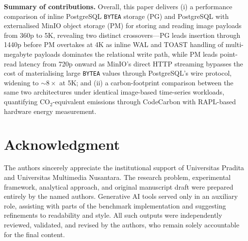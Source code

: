 \documentclass[conference]{IEEEtran}
\begin{document}
\textbf{Summary of contributions.} Overall, this paper delivers (i) a performance comparison of inline PostgreSQL \texttt{BYTEA} storage (PG) and PostgreSQL with externalised MinIO object storage (PM) for storing and reading image payloads from 360p to 5K, revealing two distinct crossovers---PG leads insertion through 1440p before PM overtakes at 4K as inline WAL and TOAST handling of multi-megabyte payloads dominates the relational write path, while PM leads point-read latency from 720p onward as MinIO's direct HTTP streaming bypasses the cost of materialising large \texttt{BYTEA} values through PostgreSQL's wire protocol, widening to $\sim$$8\times$ at 5K; and (ii) a carbon-footprint comparison between the same two architectures under identical image-based time-series workloads, quantifying CO$_2$-equivalent emissions through CodeCarbon with RAPL-based hardware energy measurement.

\section*{Acknowledgment}
The authors sincerely appreciate the institutional support of Universitas Pradita and Universitas Multimedia Nusantara. The research problem, experimental framework, analytical approach, and original manuscript draft were prepared entirely by the named authors. Generative AI tools served only in an auxiliary role, assisting with parts of the benchmark implementation and suggesting refinements to readability and style. All such outputs were independently reviewed, validated, and revised by the authors, who remain solely accountable for the final content.




\end{document}
